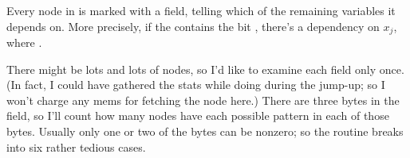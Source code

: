 Every node in  is marked with a  field,
telling which
of the remaining variables it depends on. More precisely, if the 
contains the bit , there's a dependency on $x_j$, where .

There might be lots and lots of nodes, so I'd like to examine each 
field only once. (In fact, I could have gathered the stats while doing
 during the jump-up; so I won't charge any mems for
fetching the node here.) There are three bytes in the  field,
so I'll count how many nodes have each possible pattern in each
of those bytes. Usually only one or two of the bytes can be nonzero;
so the routine breaks into six rather tedious cases.

